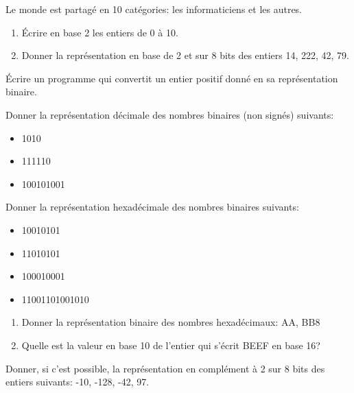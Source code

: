 \documentclass[a4paper,11pt]{article}
\begin{document}
\begin{aretenir}[Humour]
    \begin{center}
        {\Large Le monde est partagé en 10 catégories: les informaticiens et les autres.}
    \end{center}
\end{aretenir}
\begin{exo}
    \begin{enumerate}
        \item Écrire en base 2 les entiers de 0 à 10.
        \item Donner la représentation en base de 2 et sur 8 bits des entiers 14, 222, 42, 79.
    \end{enumerate}
\end{exo}
\begin{exo}
Écrire un programme qui convertit un entier positif donné en sa représentation binaire.
\end{exo}
\begin{exo}
    Donner la représentation décimale des nombres binaires (non signés) suivants:
    \begin{itemize}
        \item 1010
        \item 111110
        \item 100101001
    \end{itemize}
\end{exo}
\begin{exo}
    Donner la représentation hexadécimale des nombres binaires suivants:
    \begin{itemize}
        \item 10010101
        \item 11010101
        \item 100010001
        \item 11001101001010
    \end{itemize}
\end{exo}
\begin{exo}
    \begin{enumerate}
        \item Donner la représentation binaire des nombres hexadécimaux: AA, BB8
        \item Quelle est la valeur en base 10 de l'entier qui s'écrit BEEF en base 16?
    \end{enumerate}
\end{exo}
\begin{exo}
    Donner, si c'est possible, la représentation en complément à 2 sur 8 bits des entiers suivants: -10, -128, -42, 97.
\end{exo}
\end{document}
